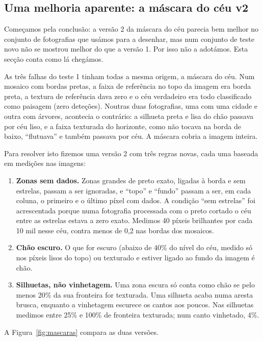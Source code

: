 \documentclass[11pt,a4paper]{article}
\begin{document}
\subsection{Uma melhoria aparente: a máscara do céu v2}
\label{sec:mascara}

Começamos pela conclusão: a versão 2 da máscara do céu parecia bem melhor no
conjunto de fotografias que usámos para a desenhar, mas num conjunto de teste
novo não se mostrou melhor do que a versão 1. Por isso não a adotámos. Esta
secção conta como lá chegámos.

As três falhas do teste 1 tinham todas a mesma origem, a máscara do céu. Num
mosaico com bordas pretas, a faixa de referência no topo da imagem era borda
preta, a textura de referência dava zero e o céu verdadeiro era todo
classificado como paisagem (zero deteções). Noutras duas fotografias, uma com
uma cidade e outra com árvores, acontecia o contrário: a silhueta preta e
lisa do chão passava por céu liso, e a faixa texturada do horizonte, como
não tocava na borda de baixo, ``flutuava'' e também passava por céu. A
máscara cobria a imagem inteira.

Para resolver isto fizemos uma versão 2 com três regras novas, cada uma
baseada em medições nas imagens:
\begin{enumerate}
  \item \textbf{Zonas sem dados.} Zonas grandes de preto exato, ligadas à
        borda e sem estrelas, passam a ser ignoradas, e ``topo'' e ``fundo''
        passam a ser, em cada coluna, o primeiro e o último píxel com dados.
        A condição ``sem estrelas'' foi acrescentada porque numa fotografia
        processada com o preto cortado o céu entre as estrelas estava a zero
        exato. Medimos 40 píxeis brilhantes por cada 10 mil nesse céu, contra
        menos de 0,2 nas bordas dos mosaicos.
  \item \textbf{Chão escuro.} O que for escuro (abaixo de 40\% do nível do
        céu, medido só nos píxeis lisos do topo) ou texturado e estiver
        ligado ao fundo da imagem é chão.
  \item \textbf{Silhuetas, não vinhetagem.} Uma zona escura só conta como chão
        se pelo menos 20\% da sua fronteira for texturada. Uma silhueta acaba
        numa aresta brusca, enquanto a vinhetagem escurece os cantos aos
        poucos. Nas silhuetas medimos entre 25\% e 100\% de fronteira
        texturada; num canto vinhetado, 4\%.
\end{enumerate}
A Figura~\ref{fig:mascaras} compara as duas versões.
\end{document}
